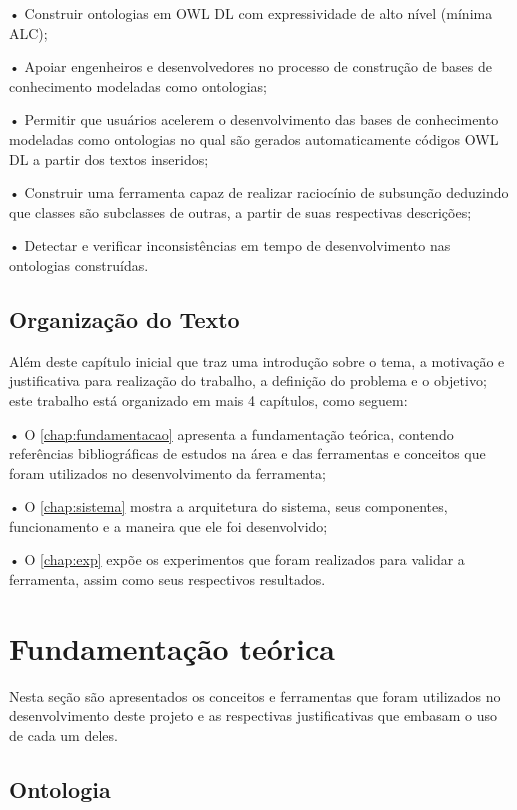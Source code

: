 \documentclass{bcc}
\begin{document}
•	Construir ontologias em OWL DL com expressividade de alto nível (mínima ALC);

•	Apoiar engenheiros e desenvolvedores no processo de construção de bases de conhecimento modeladas como ontologias;

•	Permitir que usuários acelerem o desenvolvimento das bases de conhecimento modeladas como ontologias no qual são gerados automaticamente códigos OWL DL a partir dos textos inseridos;

•	Construir uma ferramenta capaz de realizar raciocínio de subsunção deduzindo que classes são subclasses de outras, a partir de suas respectivas descrições;

•	Detectar e verificar inconsistências em tempo de desenvolvimento nas ontologias construídas.

\section{Organização do Texto}

Além deste capítulo inicial que traz uma introdução sobre o tema, a motivação e justificativa para realização do trabalho, a definição do problema e o objetivo; este trabalho está organizado em mais 4 capítulos, como seguem:

• O \autoref{chap:fundamentacao} apresenta a fundamentação teórica, contendo referências bibliográficas de estudos na área e das ferramentas e conceitos que foram utilizados no desenvolvimento da ferramenta;

• O \autoref{chap:sistema} mostra a arquitetura do sistema, seus componentes, funcionamento e a maneira que ele foi desenvolvido;

• O \autoref{chap:exp} expõe os experimentos que foram realizados para validar a ferramenta, assim como seus respectivos resultados.


\chapter{Fundamentação teórica}
\label{chap:fundamentacao}

Nesta seção são apresentados os conceitos e ferramentas que foram utilizados no desenvolvimento deste projeto e as respectivas justificativas que embasam o uso de cada um deles.

\section{Ontologia}
\end{document}
